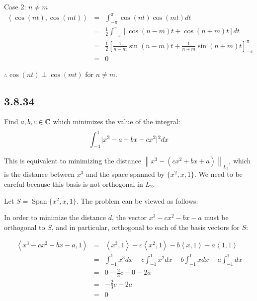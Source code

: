 \documentclass[letterpaper,12pt,fleqn]{article}
\newcommand{\norm}[1]{\left\|#1\right\|}
\newcommand{\inner}[2]{\left<#1,#2\right>}
\DeclareMathOperator{\spn}{Span}
\begin{document}
\begin{enumerate}
\begin{description}
  \item Case 2: $n\ne m$
    \begin{eqnarray*}
      \inner{\cos(nt)}{\cos(mt)} &=& \int_{-\pi}^{\pi}\cos(nt)\cos(mt)dt \\
      &=& \frac{1}{2}\int_{-\pi}^{\pi}[\cos(n-m)t+\cos(n+m)t]dt \\
      &=& \frac{1}{2}\left[\frac{1}{n-m}\sin(n-m)t+\frac{1}{n+m}\sin(n+m)t
        \right]_{-\pi}^{\pi} \\
      &=& 0
    \end{eqnarray*}
  \end{description}
  
  $\therefore\cos(nt)\perp\cos(mt)$ for $n\ne m$.
\end{enumerate}

\subsection*{3.8.34}

Find $a,b,c\in\mathbb{C}$ which minimizes the value of the integral:
\[\int_{-1}^1\lvert x^3-a-bx-cx^2\rvert^2dx\]

This is equivalent to minimizing the distance $\norm{x^3-(cx^2+bx+a)}_{L_2}$,
which is the distance between $x^3$ and the space spanned by $\{x^2,x,1\}$.
We need to be careful because this basis is not orthogonal in $L_2$.

Let $S=\spn\{x^2,x,1\}$. The problem can be viewed as follows:


In order to minimize the distance $d$, the vector $x^3-cx^2-bx-a$ must be
orthogonal to $S$, and in particular, orthogonal to each of the basis vectors
for $S$:

\begin{eqnarray*}
  \inner{x^3-cx^2-bx-a}{1} &=& \inner{x^3}{1}-c\inner{x^2}{1}-b\inner{x}{1}-
  a\inner{1}{1} \\
  &=& \int_{-1}^1x^3dx-c\int_{-1}^1x^2dx-b\int_{-1}^1xdx-a\int_{-1}^1dx \\
  &=& 0-\frac{2}{3}c-0-2a \\
  &=& -\frac{2}{3}c-2a \\
  &=& 0
\end{eqnarray*}
\end{document}
